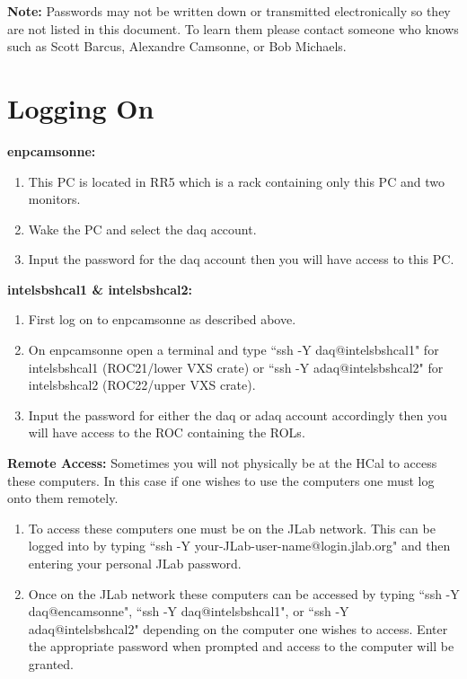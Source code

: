 \documentclass[oneside]{book}   %
\begin{document}
\textbf{\large{Note:}} 
Passwords may not be written down or transmitted electronically so they are not listed in this document. To learn them please contact someone who knows such as Scott Barcus, Alexandre Camsonne, or Bob Michaels.

\section{Logging On}
\label{sec:logging_on}

\textbf{\large{enpcamsonne:}}
\begin{enumerate}
	\item This PC is located in RR5 which is a rack containing only this PC and two monitors.
	\item Wake the PC and select the daq account.
	\item Input the password for the daq account then you will have access to this PC.
\end{enumerate}

\textbf{\large{intelsbshcal1 \& intelsbshcal2:}}
\begin{enumerate}
	\item First log on to enpcamsonne as described above.
	\item On enpcamsonne open a terminal and type ``ssh -Y daq@intelsbshcal1" for intelsbshcal1 (ROC21/lower VXS crate) or ``ssh -Y adaq@intelsbshcal2" for intelsbshcal2 (ROC22/upper VXS crate).
	\item Input the password for either the daq or adaq account accordingly then you will have access to the ROC containing the ROLs.
\end{enumerate}

\textbf{\large{Remote Access:}}
Sometimes you will not physically be at the HCal to access these computers. In this case if one wishes to use the computers one must log onto them remotely.

\begin{enumerate}
	\item To access these computers one must be on the JLab network. This can be logged into by typing ``ssh -Y your-JLab-user-name@login.jlab.org" and then entering your personal JLab password. 
	\item Once on the JLab network these computers can be accessed by typing ``ssh -Y daq@encamsonne", ``ssh -Y  daq@intelsbshcal1", or ``ssh -Y  adaq@intelsbshcal2" depending on the computer one wishes to access. Enter the appropriate password when prompted and access to the computer will be granted.
\end{enumerate}
\end{document}
